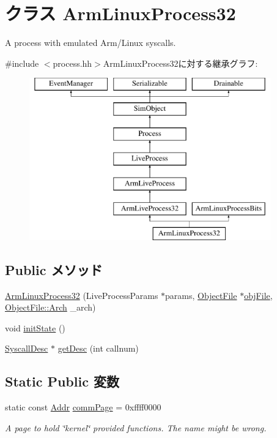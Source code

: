 \hypertarget{classArmLinuxProcess32}{
\section{クラス ArmLinuxProcess32}
\label{classArmLinuxProcess32}
}


A process with emulated Arm/Linux syscalls.  


{\ttfamily \#include $<$process.hh$>$}ArmLinuxProcess32に対する継承グラフ:\begin{figure}[H]
\begin{center}
\leavevmode
\includegraphics[height=7cm]{classArmLinuxProcess32}
\end{center}
\end{figure}
\subsection*{Public メソッド}
\begin{DoxyCompactItemize}
\item 
\hyperlink{classArmLinuxProcess32_a9ee1b5be9a1dc6fb85f2980dda11a967}{ArmLinuxProcess32} (LiveProcessParams $\ast$params, \hyperlink{classObjectFile}{ObjectFile} $\ast$\hyperlink{classLiveProcess_ab6cfcfa7903c66267b3e0351c3caa809}{objFile}, \hyperlink{classObjectFile_a0ac03ab06a859320a9072002bdf3aa0f}{ObjectFile::Arch} \_\-arch)
\item 
void \hyperlink{classArmLinuxProcess32_a3c34ea9b29f410748d4435a667484924}{initState} ()
\item 
\hyperlink{classSyscallDesc}{SyscallDesc} $\ast$ \hyperlink{classArmLinuxProcess32_aebbff609a7235342925445690acf5ee8}{getDesc} (int callnum)
\end{DoxyCompactItemize}
\subsection*{Static Public 変数}
\begin{DoxyCompactItemize}
\item 
static const \hyperlink{base_2types_8hh_af1bb03d6a4ee096394a6749f0a169232}{Addr} \hyperlink{classArmLinuxProcess32_adf050b09797e4c45baae408354f3ee1c}{commPage} = 0xffff0000
\begin{DoxyCompactList}\small\item\em A page to hold \char`\"{}kernel\char`\"{} provided functions. The name might be wrong. \item\end{DoxyCompactList}\end{DoxyCompactItemize}


